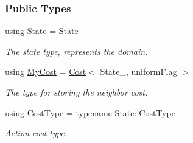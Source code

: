 \subsubsection*{Public Types}
\begin{DoxyCompactItemize}
\item 
using \hyperlink{structslb_1_1core_1_1sb_1_1StateNeighbor_aaa3fbf1d5eb514fb6ae1c39f0ee8fd85}{State} = State\+\_\+\hypertarget{structslb_1_1core_1_1sb_1_1StateNeighbor_aaa3fbf1d5eb514fb6ae1c39f0ee8fd85}{}\label{structslb_1_1core_1_1sb_1_1StateNeighbor_aaa3fbf1d5eb514fb6ae1c39f0ee8fd85}

\begin{DoxyCompactList}\small\item\em The state type, represents the domain. \end{DoxyCompactList}\item 
using \hyperlink{structslb_1_1core_1_1sb_1_1StateNeighbor_ae82f3d9d018dbde65782276aac308973}{My\+Cost} = \hyperlink{structslb_1_1core_1_1sb_1_1Cost}{Cost}$<$ State\+\_\+, uniform\+Flag $>$\hypertarget{structslb_1_1core_1_1sb_1_1StateNeighbor_ae82f3d9d018dbde65782276aac308973}{}\label{structslb_1_1core_1_1sb_1_1StateNeighbor_ae82f3d9d018dbde65782276aac308973}

\begin{DoxyCompactList}\small\item\em The type for storing the neighbor cost. \end{DoxyCompactList}\item 
using \hyperlink{structslb_1_1core_1_1sb_1_1StateNeighbor_aa42c2eb712b9d34475a4b7b12559ef62}{Cost\+Type} = typename State\+::\+Cost\+Type\hypertarget{structslb_1_1core_1_1sb_1_1StateNeighbor_aa42c2eb712b9d34475a4b7b12559ef62}{}\label{structslb_1_1core_1_1sb_1_1StateNeighbor_aa42c2eb712b9d34475a4b7b12559ef62}

\begin{DoxyCompactList}\small\item\em Action cost type. \end{DoxyCompactList}\end{DoxyCompactItemize}
